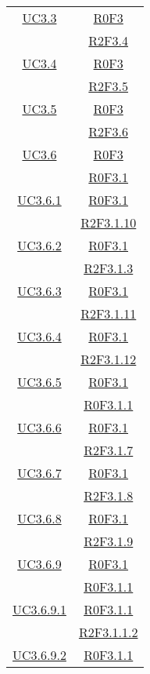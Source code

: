 \begin{longtable}{|c|c|}
\hline
\hyperlink{UC3.3}{UC3.3} & \hyperlink{R0F3}{R0F3}\\
& \hyperlink{R2F3.4}{R2F3.4}\\
\hline
\hyperlink{UC3.4}{UC3.4} & \hyperlink{R0F3}{R0F3}\\
& \hyperlink{R2F3.5}{R2F3.5}\\
\hline
\hyperlink{UC3.5}{UC3.5} & \hyperlink{R0F3}{R0F3}\\
& \hyperlink{R2F3.6}{R2F3.6}\\
\hline
\hyperlink{UC3.6}{UC3.6} & \hyperlink{R0F3}{R0F3}\\
& \hyperlink{R0F3.1}{R0F3.1}\\
\hline
\hyperlink{UC3.6.1}{UC3.6.1} & \hyperlink{R0F3.1}{R0F3.1}\\
& \hyperlink{R2F3.1.10}{R2F3.1.10}\\
\hline
\hyperlink{UC3.6.2}{UC3.6.2} & \hyperlink{R0F3.1}{R0F3.1}\\
& \hyperlink{R2F3.1.3}{R2F3.1.3}\\
\hline
\hyperlink{UC3.6.3}{UC3.6.3} & \hyperlink{R0F3.1}{R0F3.1}\\
& \hyperlink{R2F3.1.11}{R2F3.1.11}\\
\hline
\hyperlink{UC3.6.4}{UC3.6.4} & \hyperlink{R0F3.1}{R0F3.1}\\
& \hyperlink{R2F3.1.12}{R2F3.1.12}\\
\hline
\hyperlink{UC3.6.5}{UC3.6.5} & \hyperlink{R0F3.1}{R0F3.1}\\
& \hyperlink{R0F3.1.1}{R0F3.1.1}\\
\hline
\hyperlink{UC3.6.6}{UC3.6.6} & \hyperlink{R0F3.1}{R0F3.1}\\
& \hyperlink{R2F3.1.7}{R2F3.1.7}\\
\hline
\hyperlink{UC3.6.7}{UC3.6.7} & \hyperlink{R0F3.1}{R0F3.1}\\
& \hyperlink{R2F3.1.8}{R2F3.1.8}\\
\hline
\hyperlink{UC3.6.8}{UC3.6.8} & \hyperlink{R0F3.1}{R0F3.1}\\
& \hyperlink{R2F3.1.9}{R2F3.1.9}\\
\hline
\hyperlink{UC3.6.9}{UC3.6.9} & \hyperlink{R0F3.1}{R0F3.1}\\
& \hyperlink{R0F3.1.1}{R0F3.1.1}\\
\hline
\hyperlink{UC3.6.9.1}{UC3.6.9.1} & \hyperlink{R0F3.1.1}{R0F3.1.1}\\
& \hyperlink{R2F3.1.1.2}{R2F3.1.1.2}\\
\hline
\hyperlink{UC3.6.9.2}{UC3.6.9.2} & \hyperlink{R0F3.1.1}{R0F3.1.1}\\

\end{longtable}
